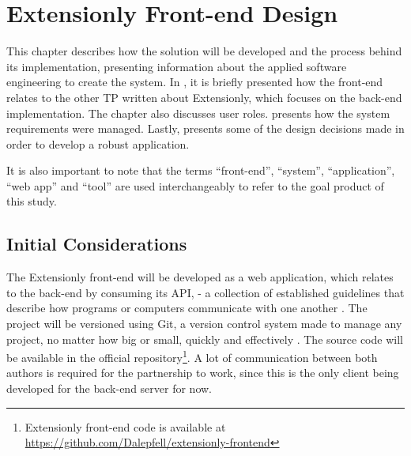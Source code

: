 \chapter{Extensionly Front-end Design}\label{extensionly}

This chapter describes how the solution will be developed and the process behind its implementation, presenting information about the applied software engineering to create the system. In , it is briefly presented how the front-end relates to the other \ac{TP} written about Extensionly, which focuses on the back-end implementation. The chapter also discusses user roles.  presents how the system requirements were managed. Lastly,  presents some of the design decisions made in order to develop a robust application.

It is also important to note that the terms ``front-end'', ``system'', ``application'', ``web app'' and ``tool'' are used interchangeably to refer to the goal product of this study.

\section{Initial Considerations}\label{ext:initial-considerations}

The Extensionly front-end will be developed as a web application, which relates to the back-end by consuming its \ac{API}, - a collection of established guidelines that describe how programs or computers communicate with one another \cite{ibmapi}. The project will be versioned using Git, a version control system made to manage any project, no matter how big or small, quickly and effectively \cite{chacon2014pro}. The source code will be available in the official repository\footnote{Extensionly front-end code is available at \url{https://github.com/Dalepfell/extensionly-frontend}}. A lot of communication between both authors is required for the partnership to work, since this is the only client being developed for the back-end server for now.

